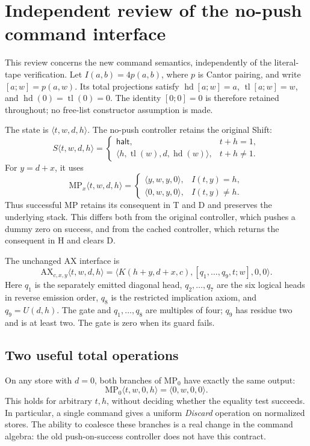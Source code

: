 \section{Independent review of the no-push command interface}
\label{sec:nopush-independent-review}

This review concerns the new command semantics, independently of the
literal-tape verification. Let $I(a,b)=4p(a,b)$, where $p$ is Cantor
pairing, and write $[a;w]=p(a,w)$. Its total projections satisfy
$\operatorname{hd}[a;w]=a$, $\operatorname{tl}[a;w]=w$, and
$\operatorname{hd}(0)=\operatorname{tl}(0)=0$.
The identity $[0;0]=0$ is therefore retained throughout; no free-list
constructor assumption is made.

The state is $\langle t,w,d,h\rangle$. The no-push controller retains
the original Shift:
\[
 S\langle t,w,d,h\rangle=
 \begin{cases}
  \mathsf{halt},&t+h=1,\\
  \langle h,\operatorname{tl}(w),d,\operatorname{hd}(w)\rangle,&t+h\ne1.
 \end{cases}
\]
For $y=d+x$, it uses
\[
 \mathrm{MP}_x\langle t,w,d,h\rangle=
 \begin{cases}
  \langle y,w,y,0\rangle,&I(t,y)=h,\\
  \langle0,w,y,0\rangle,&I(t,y)\ne h.
 \end{cases}
\]
Thus successful MP retains its consequent in T and D and preserves the
underlying stack. This differs both from the original controller, which
pushes a dummy zero on success, and from the cached controller, which
returns the consequent in H and clears D.

The unchanged AX interface is
\[
 \mathrm{AX}_{c,x,y}\langle t,w,d,h\rangle
 =\langle K(h+y,d+x,c),[q_1,\ldots,q_9,t;w],0,0\rangle.
\]
Here $q_1$ is the separately emitted diagonal head, $q_2,\ldots,q_7$
are the six logical heads in reverse emission order, $q_8$ is the
restricted implication axiom, and $q_9=U(d,h)$.
The gate and $q_1,\ldots,q_8$ are multiples of four; $q_9$ has residue
two and is at least two. The gate is zero when its guard fails.

\subsection{Two useful total operations}

On any store with $d=0$, both branches of $\mathrm{MP}_0$ have exactly
the same output:
\[
 \mathrm{MP}_0\langle t,w,0,h\rangle=\langle0,w,0,0\rangle.
\]
This holds for arbitrary $t,h$, without deciding whether the equality
test succeeds. In particular, a single command gives a uniform
\emph{Discard} operation on normalized stores. The ability to coalesce
these branches is a real change in the command algebra: the old
push-on-success controller does not have this contract.

